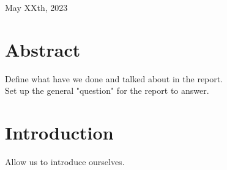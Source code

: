 \documentclass{article}
\begin{document}
\begin{titlepage}
    
    
    \vfill\vfill\vfill %
    
    {\large May XXth, 2023} %
    
    
     
    
    \vfill %
    
  \end{titlepage}


\pagebreak

\section*{Abstract}
Define what have we done and talked about in the report.\\
Set up the general "question" for the report to answer.\\


\vspace{11cm}
\tableofcontents
\pagebreak

\section*{Introduction}
 \addtocounter{section}{1}
Allow us to introduce ourselves.
\end{document}
